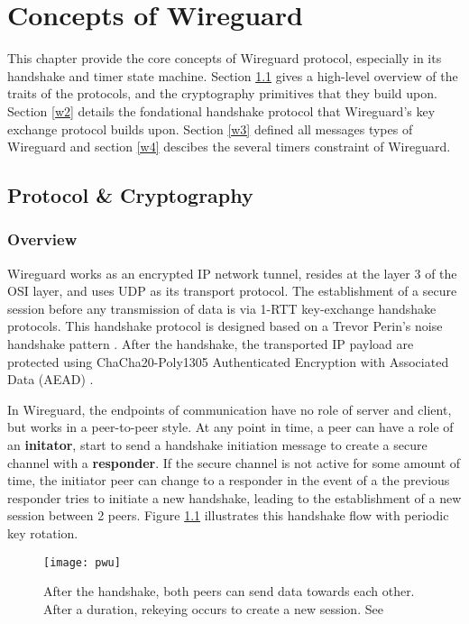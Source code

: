 \chapter{Concepts of Wireguard} \label{chap:wireguard}
  This chapter provide the core concepts of Wireguard protocol, especially in its handshake
  and timer state machine. Section \ref{w1} gives a high-level overview of the traits of the
  protocols, and the cryptography primitives that they build upon. 
  Section \ref{w2}  details the fondational handshake protocol that Wireguard's
  key exchange protocol builds upon. Section \ref{w3} defined all messages types of Wireguard and
  section \ref{w4} descibes the several timers constraint of Wireguard.
\section{Protocol \& Cryptography} \label{w1}
\subsection{Overview}
 Wireguard works as an encrypted IP network tunnel, resides at the layer 3 of the OSI layer, and
 uses UDP as its transport protocol. The establishment of a secure session before any 
 transmission of data is via 1-RTT key-exchange handshake protocols. This handshake protocol
 is designed based on a Trevor Perin's noise handshake pattern \cite{noise}. After the handshake, the  
 transported IP payload are protected using ChaCha20-Poly1305 Authenticated Encryption with 
 Associated Data (AEAD) \cite{rfc8439}.

 In Wireguard, the endpoints of communication have no role of server and client, but works in a
 peer-to-peer style. At any point in time, a peer can have a role of an \textbf{initator}, start to send 
 a handshake initiation message to create a secure channel with a \textbf{responder}. If the secure channel
 is not active for some amount of time, the initiator peer can change to a responder in the event of
 a the previous responder tries to initiate a new handshake, leading to the establishment of a new session
 between 2 peers. Figure \ref{fig:pwu_hs} illustrates this handshake flow with periodic key rotation.

\begin{figure}[h]
  \centering
  \texttt{[image: pwu]}
  \caption{After the handshake, both peers can send data towards each other. After a duration, rekeying occurs to create a new session. See \cite[p.~7]{pwu}}
  \label{fig:pwu_hs}
\end{figure}

